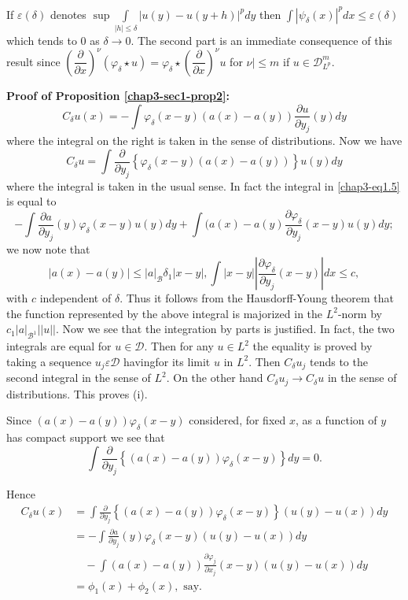 If $\varepsilon (\delta)$ denotes $\sup \int\limits_{|h| \leq
  \delta}|u (y)-u(y + h)|^p dy$ then $\int |\psi_\delta (x)|^p
dx \leq \varepsilon (\delta)$ which tends to 0 as $\delta \to 0$. The second
part is an immediate consequence of this result since
$\left(\dfrac{\partial}{\partial x}\right)^\nu (\varphi_\delta \star u)=
\varphi_\delta \star \left(\dfrac{\partial}{\partial x}\right)^\nu u $
for $\nu |
\leq m$ if $u \in \mathscr{D}^m_{L^p}$. 

\medskip
\noindent
{\bf Proof of Proposition \ref{chap3-sec1-prop2}:}
\begin{equation}
C_\delta u(x)=- \int \varphi_\delta (x-y)(a(x)- a(y)) \frac{\partial
  u}{\partial y_j} (y)dy \tag{1.4}\label{chap3-eq1.4} 
\end{equation}
where the integral on the right is taken in the sense of
distributions. Now we have 
\begin{equation}
C_\delta u= \int \frac{\partial}{\partial y_j} \left\{ \varphi_\delta
(x-y) (a(x)- a(y))\right\} u(y) dy \tag{1.5}\label{chap3-eq1.5} 
\end{equation}
where the integral is taken in the usual sense. In fact the integral
in \eqref{chap3-eq1.5} is equal to  
$$
- \int \frac{\partial a}{\partial y_j}(y) \varphi_\delta (x-y) u(y)dy 
+ \int (a(x)- a(y) \frac{\partial \varphi_\delta}{\partial y_j}(x-y) u
(y) dy; 
$$
we now note that  
$$
|a(x)-a(y)| \leq |a|_\mathscr{B} \delta_1 |x-y|,  \int |x-y||
\frac{\partial \varphi_\delta}{\partial y_j}(x-y)| dx \leq c, 
$$ 
with $c$ independent of $\delta$. Thus it follows from the
Hausdorff-Young theorem that the function represented by the above
integral is majorized in the $L^2$-norm by $c_1 |a|_{\mathscr{B}^1}
||u||$. Now we see that the integration by parts is  justified. In
fact,  the 
two integrals are equal for $u \in \mathscr{D}$. Then for any
$u \in L^2$ the equality is proved by taking a sequence $u_j
\varepsilon \mathscr{D}$ having\pageoriginale for its limit $u$ in
$L^2$. Then 
$C_\delta u_j$ tends to the second integral in the sense of $L^2$. On
the other hand $C_\delta u_j \to C_\delta u$ in the sense of
distributions. This proves (i). 

Since $(a(x)-a(y)) \varphi_\delta (x-y)$ considered, for fixed $x$,
as a function of $y$ has compact support we see that  
$$
\int \frac{\partial}{\partial y_j} \left\{ (a(x)- a (y)) 
\varphi_\delta (x-y) \right\} dy=0. 
$$

Hence 
\begin{align*}
C_\delta u(x) & = \int \frac{\partial}{\partial y_j}\left\{ (a(x)- a
(y)) \varphi_\delta (x-y) \right\} (u(y)- u(x)) dy\\ 
& = - \int \frac{\partial a}{\partial y_j}(y) \varphi_\delta (x-y)
(u(y)-u(x))dy\\
&\quad - \int (a(x)-a(y))\frac{\partial \varphi_j}{\partial x_j}
(x-y)
 (u(y)- u(x)) dy\\ 
& = \phi_1 (x) + \phi_2 (x),  \text{ say}. 
\end{align*}

